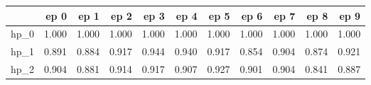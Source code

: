 \begin{tabular}{lrrrrrrrrrr}
\toprule
{} &   ep 0 &   ep 1 &   ep 2 &   ep 3 &   ep 4 &   ep 5 &   ep 6 &   ep 7 &   ep 8 &   ep 9 \\
\midrule
hp\_0 &  1.000 &  1.000 &  1.000 &  1.000 &  1.000 &  1.000 &  1.000 &  1.000 &  1.000 &  1.000 \\
hp\_1 &  0.891 &  0.884 &  0.917 &  0.944 &  0.940 &  0.917 &  0.854 &  0.904 &  0.874 &  0.921 \\
hp\_2 &  0.904 &  0.881 &  0.914 &  0.917 &  0.907 &  0.927 &  0.901 &  0.904 &  0.841 &  0.887 \\
\bottomrule
\end{tabular}
